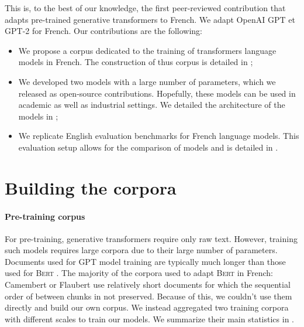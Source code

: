 This is, to the best of our knowledge, the first peer-reviewed contribution that adapts pre-trained generative transformers to French. We adapt OpenAI GPT et GPT-2 \parencite{radford_2018, radford_2019} for French. Our contributions are the following:
\begin{itemize}
    \item We propose a corpus dedicated to the training of transformers language models in French. The construction of thus corpus is detailed in  ;
    \item We developed two models with a large number of parameters, which we released as open-source contributions. Hopefully, these models can be used in academic as well as industrial settings. We detailed the architecture of the models in  ;
    \item We replicate English evaluation benchmarks for French language models. This evaluation setup allows for the comparison of models and is detailed in .
\end{itemize}

\section{Building the corpora}

\paragraph{Pre-training corpus} For pre-training, generative transformers require only raw text. However, training such models requires large corpora due to their large number of parameters. Documents used for GPT model training are typically much longer than those used for \textsc{Bert} \parencite{devlin_19}. The majority of the corpora used to adapt \textsc{Bert} in French: Camembert \parencite{martin_20} or Flaubert \parencite{le_20b, le_20a} use relatively short documents for which the sequential order of between chunks in not preserved. Because of this, we couldn't use them directly and build our own corpus. We instead aggregated two training corpora with different scales to train our models. We summarize their main statistics in .


